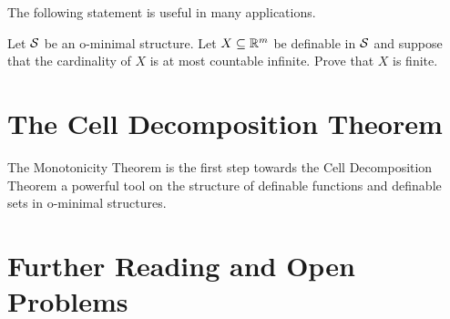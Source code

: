 The following statement is useful in many applications. 

\begin{exercise}
  Let ${\mathcal S}$ be an o-minimal structure. 
  Let $X\subseteq{\mathbb{R}}^m$ be definable in ${\mathcal S}$ and suppose that the
  cardinality of $X$ is at most countable infinite. Prove that $X$ is
  finite. 
\end{exercise}


\section{The Cell Decomposition Theorem}

The Monotonicity Theorem is the first step towards the Cell
Decomposition Theorem a powerful tool on the structure of definable
functions and definable sets in o-minimal structures.

\section{Further Reading and Open Problems}


